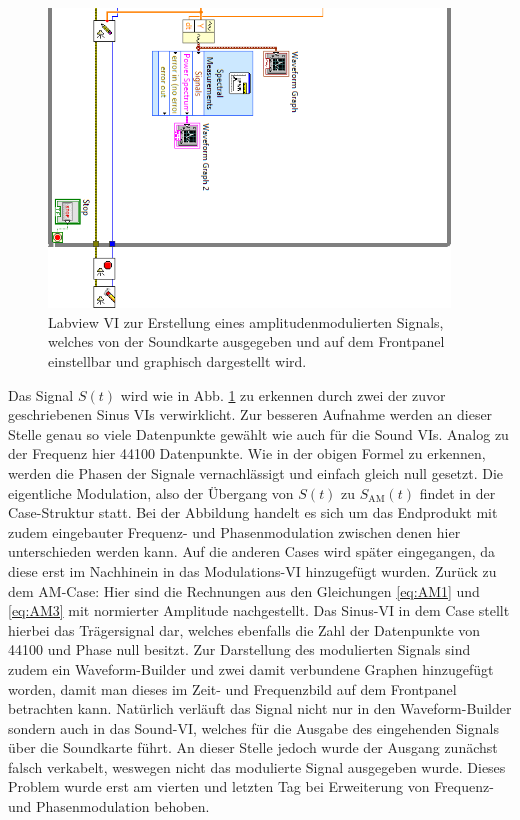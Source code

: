 		\begin{figure}[H]
			\centering
			\includegraphics[width=0.95\textwidth]{pic/am2.png}
			\caption{Labview VI zur Erstellung eines amplitudenmodulierten Signals, welches von der Soundkarte ausgegeben und auf dem Frontpanel einstellbar und graphisch dargestellt wird.}
			\label{fig:am}	
		\end{figure} 
		
		\thispagestyle{empty}
		Das Signal $S(t)$ wird wie in Abb. \ref{fig:am} zu erkennen durch zwei der zuvor geschriebenen Sinus VIs verwirklicht.
		Zur besseren Aufnahme werden an dieser Stelle genau so viele Datenpunkte gewählt wie auch für die Sound VIs. 
		Analog zu der Frequenz hier 44100 Datenpunkte.
		Wie in der obigen Formel zu erkennen, werden die Phasen der Signale vernachlässigt und einfach gleich null gesetzt.
		Die eigentliche Modulation, also der Übergang von $S(t)$ zu $S_\text{AM}(t)$ findet in der Case-Struktur statt.
		Bei der Abbildung handelt es sich um das Endprodukt mit zudem eingebauter Frequenz- und Phasenmodulation zwischen denen hier unterschieden werden kann.
		Auf die anderen Cases wird später eingegangen, da diese erst im Nachhinein in das Modulations-VI hinzugefügt wurden.
		Zurück zu dem AM-Case: Hier sind die Rechnungen aus den Gleichungen \ref{eq:AM1} und \ref{eq:AM3} mit normierter Amplitude nachgestellt.
		Das Sinus-VI in dem Case stellt hierbei das Trägersignal dar, welches ebenfalls die Zahl der Datenpunkte von 44100 und Phase null besitzt.
		Zur Darstellung des modulierten Signals sind zudem ein Waveform-Builder und zwei damit verbundene Graphen hinzugefügt worden, damit man dieses im Zeit- und Frequenzbild auf dem Frontpanel betrachten kann.
		Natürlich verläuft das Signal nicht nur in den Waveform-Builder sondern auch in das Sound-VI, welches für die Ausgabe des eingehenden Signals über die Soundkarte führt.
		An dieser Stelle jedoch wurde der Ausgang zunächst falsch verkabelt, weswegen nicht das modulierte Signal ausgegeben wurde.
		Dieses Problem wurde erst am vierten und letzten Tag bei Erweiterung von Frequenz- und Phasenmodulation behoben.
		
